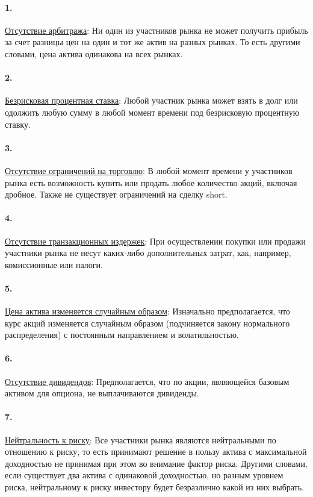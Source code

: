 \documentclass[a4paper]{article}
\begin{document}
\paragraph*{1.} \underline{Отсутствие арбитража}: Ни один из участников рынка не может получить прибыль за счет разницы цен на один и тот же актив на разных рынках. То есть другими словами, цена актива одинакова на всех рынках.
\paragraph*{2.} \underline{Безрисковая процентная ставка}: Любой участник рынка может взять в долг или одолжить любую сумму в любой момент времени под безрисковую процентную ставку.
\paragraph*{3.} \underline{Отсутствие ограничений на торговлю}: В любой момент времени у участников рынка есть возможность купить или продать любое количество акций, включая дробное. Также не существует ограничений на сделку short.
\paragraph*{4.} \underline{Отсутствие транзакционных издержек}: При осуществлении покупки или продажи участники рынка не несут каких-либо дополнительных затрат, как, например, комиссионные или налоги.
\paragraph*{5.} \underline{Цена актива изменяется случайным образом}: Изначально предполагается, что курс акций изменяется случайным образом (подчиняется закону нормального распределения) с постоянным направлением и волатильностью.
\paragraph*{6.} \underline{Отсутствие дивидендов}: Предполагается, что по акции, являющейся базовым активом для опциона, не выплачиваются дивиденды.

\paragraph*{7.} \underline{Нейтральность к риску}: Все участники рынка являются нейтральными по отношению к риску, то есть принимают решение в пользу актива с максимальной доходностью не принимая при этом во внимание фактор риска. Другими словами, если существует два актива с одинаковой доходностью, но разным уровнем риска, нейтральному к риску инвестору будет безразлично какой из них выбрать.
\end{document}
